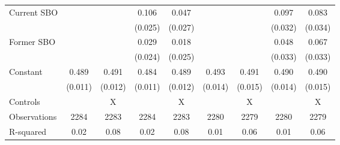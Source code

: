 {\begin{tabular}{l*{8}{c}}
Current SBO         &                     &                     &       0.106\sym{***}&       0.047         &                     &                     &       0.097\sym{**} &       0.083\sym{*}  \\
                    &                     &                     &     (0.025)         &     (0.027)         &                     &                     &     (0.032)         &     (0.034)         \\
Former SBO          &                     &                     &       0.029         &       0.018         &                     &                     &       0.048         &       0.067\sym{*}  \\
                    &                     &                     &     (0.024)         &     (0.025)         &                     &                     &     (0.033)         &     (0.033)         \\
Constant            &       0.489\sym{***}&       0.491\sym{***}&       0.484\sym{***}&       0.489\sym{***}&       0.493\sym{***}&       0.491\sym{***}&       0.490\sym{***}&       0.490\sym{***}\\
                    &     (0.011)         &     (0.012)         &     (0.011)         &     (0.012)         &     (0.014)         &     (0.015)         &     (0.014)         &     (0.015)         \\
\hline
Controls            &                     &           X         &                     &           X         &                     &           X         &                     &           X         \\
Observations        &        2284         &        2283         &        2284         &        2283         &        2280         &        2279         &        2280         &        2279         \\
R-squared           &        0.02         &        0.08         &        0.02         &        0.08         &        0.01         &        0.06         &        0.01         &        0.06         \\
\hline\hline
\end{tabular}
}
